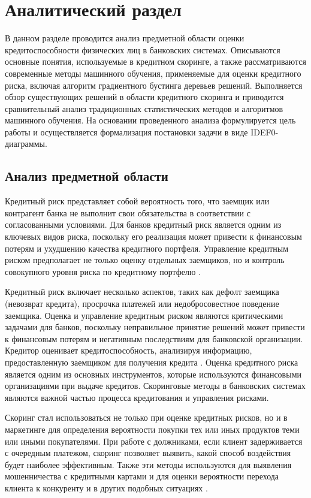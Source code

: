 \section{Аналитический раздел}

В данном разделе проводится анализ предметной области оценки кредитоспособности физических лиц в банковских системах. Описываются основные понятия, используемые в кредитном скоринге, а также рассматриваются современные методы машинного обучения, применяемые для оценки кредитного риска, включая алгоритм градиентного бустинга деревьев решений. Выполняется обзор существующих решений в области кредитного скоринга и приводится сравнительный анализ традиционных статистических методов и алгоритмов машинного обучения. На основании проведенного анализа формулируется цель работы и осуществляется формализация постановки задачи в виде IDEF0-диаграммы.

\subsection{Анализ предметной области}

Кредитный риск представляет собой вероятность того, что заемщик или контрагент банка не выполнит свои обязательства в соответствии с согласованными условиями. Для банков кредитный риск является одним из ключевых видов риска, поскольку его реализация может привести к финансовым потерям и ухудшению качества кредитного портфеля. Управление кредитным риском предполагает не только оценку отдельных заемщиков, но и контроль совокупного уровня риска по кредитному портфелю \cite{BaselCreditRisk}.

Кредитный риск включает несколько аспектов, таких как дефолт заемщика (невозврат кредита), просрочка платежей или недобросовестное поведение заемщика. Оценка и управление кредитным риском являются критическими задачами для банков, поскольку неправильное принятие решений может привести к финансовым потерям и негативным последствиям для банковской организации. Кредитор оценивает кредитоспособность, анализируя информацию, предоставленную заемщиком для получения кредита \cite{Konovalova}. Оценка кредитного риска является одним из основных инструментов, которые используются финансовыми организациями при выдаче кредитов. Скоринговые методы в банковских системах являются важной частью процесса кредитования и управления рисками.

Скоринг стал использоваться не только при оценке кредитных рисков, но и в маркетинге для определения вероятности покупки тех или иных продуктов теми или иными покупателями. При работе с должниками, если клиент задерживается с очередным платежом, скоринг позволяет выявить, какой способ воздействия будет наиболее эффективным. Также эти методы используются для выявления мошенничества с кредитными картами и для оценки вероятности перехода клиента к конкуренту и в других подобных ситуациях \cite{Zaernuk}.

